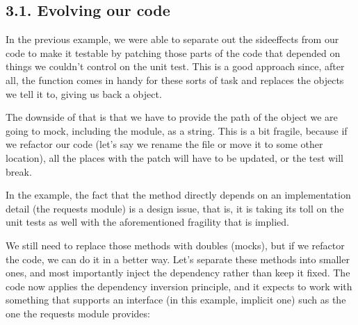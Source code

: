 \documentclass[a4paper,10pt,english]{sphinxmanual}
\begin{document}
\subsection{3.1. Evolving our code}
\label{\detokenize{chapters/8_unit_testing/index:evolving-our-code}}
In the previous example, we were able to separate out the side\sphinxhyphen{}effects from our code to
make it testable by patching those parts of the code that depended on things we couldn’t
control on the unit test. This is a good approach since, after all, the  function
comes in handy for these sorts of task and replaces the objects we tell it to, giving us back a
 object.

The downside of that is that we have to provide the path of the object we are going to
mock, including the module, as a string. This is a bit fragile, because if we refactor our code
(let’s say we rename the file or move it to some other location), all the places with the patch
will have to be updated, or the test will break.

In the example, the fact that the  method directly depends on an implementation
detail (the requests module) is a design issue, that is, it is taking its toll on the unit tests as
well with the aforementioned fragility that is implied.

We still need to replace those methods with doubles (mocks), but if we refactor the code,
we can do it in a better way. Let’s separate these methods into smaller ones, and most
importantly inject the dependency rather than keep it fixed. The code now applies
the dependency inversion principle, and it expects to work with something that supports
an interface (in this example, implicit one) such as the one the requests module provides:
\end{document}
